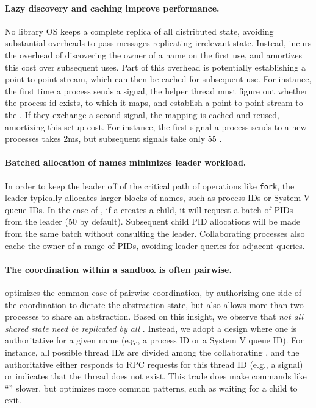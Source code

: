 \paragraph{Lazy discovery and caching improve performance.}  
No library OS keeps a complete replica of all distributed state,
avoiding substantial overheads to pass messages replicating irrelevant state.
Instead, \graphene{} incurs the overhead of discovering the owner of a name
on the first use, and amortizes this cost over subsequent uses.
Part of this overhead is potentially establishing a point-to-point stream,
which can then be cached for subsequent use.
For instance, the first time a process sends a signal, the helper thread 
must figure out whether the process id exists, to which \picoproc{} it maps,
and establish a point-to-point stream to the \picoproc{}.
If they exchange a second signal, the mapping is cached and reused, amortizing this 
setup cost.  For instance, the first signal a process sends to a new processes
takes \roughly{}2ms, but subsequent signals take only \roughly{}55 \us{}.

\paragraph{Batched allocation of names minimizes leader workload.}
In order to keep the leader off of the critical path of operations like {\tt fork}, 
the leader typically allocates larger blocks of names, such as process IDs or System V queue IDs.
In the case of , if a \picoproc{} creates a child, it will request a batch of 
PIDs from the leader (50 by default).  Subsequent child PID allocations will be made from the same 
batch without consulting the leader.
Collaborating processes also cache the owner of a range of PIDs, avoiding 
leader queries for adjacent queries.

\paragraph{The coordination within a sandbox is often pairwise.}
\graphene{} optimizes the common case of pairwise coordination,
by authorizing one side of the coordination to dictate the abstraction state,
but also allows
more than two processes to share an abstraction.
Based on this insight, 
we observe that {\em not all shared state need be replicated by all \picoprocs{}}.
Instead, we adopt a design where one \picoproc{} is authoritative for a given name (e.g., a process ID or a System V queue ID).
For instance, all possible thread IDs are divided among the collaborating \picoprocs{},
and the authoritative \picoproc{} either responds to RPC requests for this thread ID (e.g., a signal)
or indicates that the thread does not exist.
This trade does make commands like ``'' slower, 
but optimizes more common patterns, such as waiting for a child to exit.

